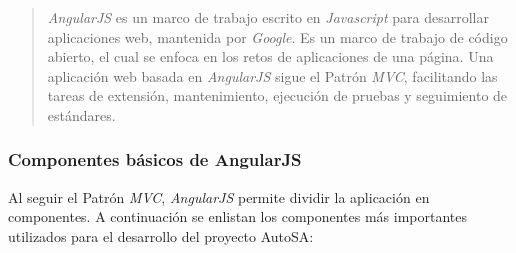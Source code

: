 \begin{quote}
	\textit{AngularJS} es un marco de trabajo escrito en \textit{Javascript} para desarrollar aplicaciones web, mantenida por \textit{Google}. Es un marco de trabajo de código abierto, el cual se enfoca en los retos de aplicaciones de una página. Una aplicación web basada en \textit{AngularJS} sigue el Patrón \textit{MVC}, facilitando las tareas de extensión, mantenimiento, ejecución de pruebas y seguimiento de estándares\cite{FullStackAngularJS}.
\end{quote}

\subsubsection{Componentes básicos de AngularJS}
Al seguir el Patrón \textit{MVC}, \textit{AngularJS} permite dividir la aplicación en componentes. A continuación se enlistan los componentes más importantes utilizados para el desarrollo del proyecto AutoSA\cite{FullStackAngularJS, LearningAngularJS, AngularJSEssentials}:

